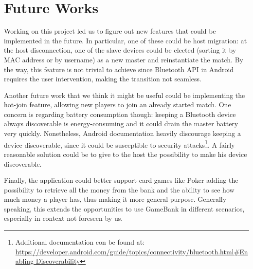 \section{Future Works}
\label{future_works}

Working on this project led us to figure out new features that could be 
implemented in the future. In particular, one of these could be host migration: 
at the host disconnection, one of the slave devices could be elected (sorting it 
by MAC address or by username) as a new master and reinstantiate the match. 
By the way, this feature is not trivial to achieve since Bluetooth API in 
Android requires the user intervention, making the transition not seamless.

Another future work that we think it might be useful could be implementing 
the hot-join feature, allowing new players to join an already started match. 
One concern is regarding battery consumption though: keeping a Bluetooth device 
always discoverable is energy-consuming and it could drain the master battery 
very quickly. Nonetheless, Android documentation heavily discourage keeping a 
device discoverable, since it could be susceptible to security 
attacks\footnote{Additional documentation con be found at: \url{ 
https://developer.android.com/guide/topics/connectivity/bluetooth.html\#Enabling
Discoverability}}.
A fairly reasonable solution could be to give to the host the possibility to 
make his device discoverable.

Finally, the application could better support card games like Poker adding the 
possibility to retrieve all the money from the bank and the ability to see 
how much money a player has, thus making it more general purpose. Generally 
speaking, this extends the opportunities to use GameBank in different scenarios, 
especially in context not foreseen by us.